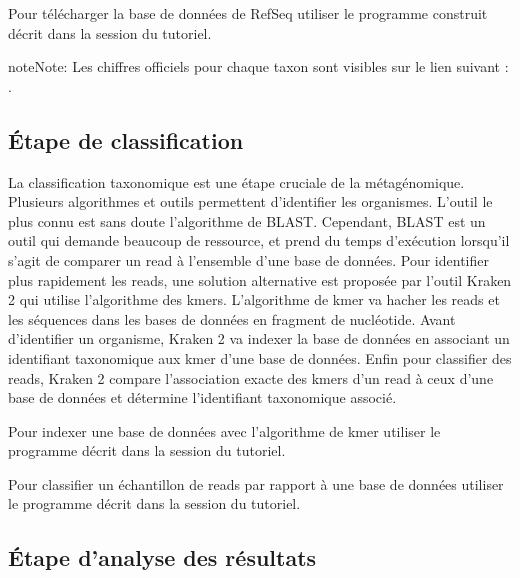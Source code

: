 \documentclass[letterpaper,10pt,french]{sphinxmanual}
\begin{document}
Pour télécharger la base de données de RefSeq utiliser le programme construit décrit dans la session {\hyperref[\detokenize{tutorial:download-refseq}]{}} du tutoriel.

\begin{sphinxadmonition}{note}{Note:}
Les chiffres officiels pour chaque taxon sont visibles sur le lien suivant :  .
\end{sphinxadmonition}


\subsection{Étape de classification}
\label{\detokenize{overview:etape-de-classification}}
La classification taxonomique est une étape cruciale de la métagénomique. Plusieurs algorithmes et outils permettent d’identifier les organismes. L’outil le plus connu est sans doute l’algorithme de BLAST. Cependant, BLAST est un outil qui demande beaucoup de ressource, et prend du temps d’exécution lorsqu’il s’agit de comparer un read à l’ensemble d’une base de données. Pour identifier plus rapidement les reads, une solution alternative est proposée par l’outil Kraken 2 qui utilise l’algorithme des k\sphinxhyphen{}mers. L’algorithme de k\sphinxhyphen{}mer va hacher les reads et les séquences dans les bases de données en fragment de nucléotide. Avant d’identifier un organisme, Kraken 2 va indexer la base de données en associant un identifiant taxonomique aux k\sphinxhyphen{}mer d’une base de données. Enfin pour classifier des reads, Kraken 2 compare l’association exacte des k\sphinxhyphen{}mers d’un read à ceux d’une base de données et détermine l’identifiant taxonomique associé.

Pour indexer une base de données avec l’algorithme de k\sphinxhyphen{}mer utiliser le programme décrit dans la session {\hyperref[\detokenize{tutorial:indexation-kraken2}]{}} du tutoriel.

Pour classifier un échantillon de reads par rapport à une base de données utiliser le programme décrit dans la session {\hyperref[\detokenize{tutorial:classification-kraken2}]{}} du tutoriel.


\subsection{Étape d’analyse des résultats}
\label{\detokenize{overview:etape-d-analyse-des-resultats}}
\end{document}
